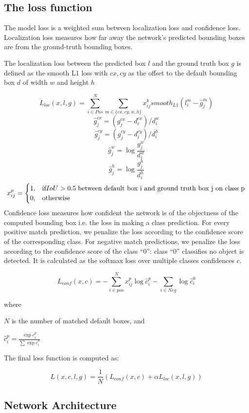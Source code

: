 \documentclass[12pt,letterpaper]{article}
\begin{document}
\subsection{The loss function}

The model loss is a weighted sum between localization loss and confidence loss. Localization loss measures how far away the network’s predicted bounding boxes are from the ground-truth bounding boxes.

The localization loss between the predicted box $l$ and the ground truth box $g$ is defined as the smooth L1 loss with $cx,cy$ as the offset to the default bounding box $d$ of width $w$ and height $h$

\[  L_{loc}(x,l,g) = \sum^{N}_{i \in Pos} \sum_{m \in \{cx,cy,w,h\}}x_{ij}^{k} smooth_{L1}(l_{i}^{m} - \widehat{g}_{j}^{m})    \]
\[\hat{g}_{j}^{cx}=(g_{j}^{cx}-d_{i}^{cx})/d_{i}^{w} \]
\[\hat{g}_{j}^{cy}=(g_{j}^{cy}-d_{i}^{cy})/d_{i}^{h}\]
\[ \hat{g}_{j}^{w} = \log{\frac{g_{j}^{w}}{d_{i}^{w}}} \]
\[\hat{g}_{j}^{h} = \log{\frac{g_{j}^{h}}{d_{i}^{h}}} \]
\[
    x_{ij}^{p} = 
    \begin{cases}
    1, & \text{if} IoU > 0.5 \; \textnormal{between default box i and ground truth box j on class p} \\
    0, & \text{otherwise}
    \end{cases}
    \]
Confidence loss measures how confident the network is of the objectness of the computed bounding box i.e. the loss in making a class prediction. For every positive match prediction, we penalize the loss according to the confidence score of the corresponding class. For negative match predictions, we penalize the loss according to the confidence score of the class “0”: class “0” classifies no object is detected. It is calculated as the softmax loss over multiple classes confidences $c$.

\[  L_{conf}(x,c) = -\sum_{i \in pos}^{N} x_{ij}^{p} \log{\hat{c}_{i}^{p}} - \sum_{i \in Neg}\log{\hat{c}_{i}^{0}}  \]

where

$N$ is the number of matched default boxes, and

$\hat{c}_{i}^{p} = \frac{\exp{c_{i}^{p}}}{\sum \exp{c_{i}^{p}}}$


The final loss function is computed as:

\[ L(x,c,l,g) = \frac{1}{N}(L_{conf}(x,c) + \alpha L_{loc}(x,l,g)) \]

\subsection{Network Architecture}
\end{document}
